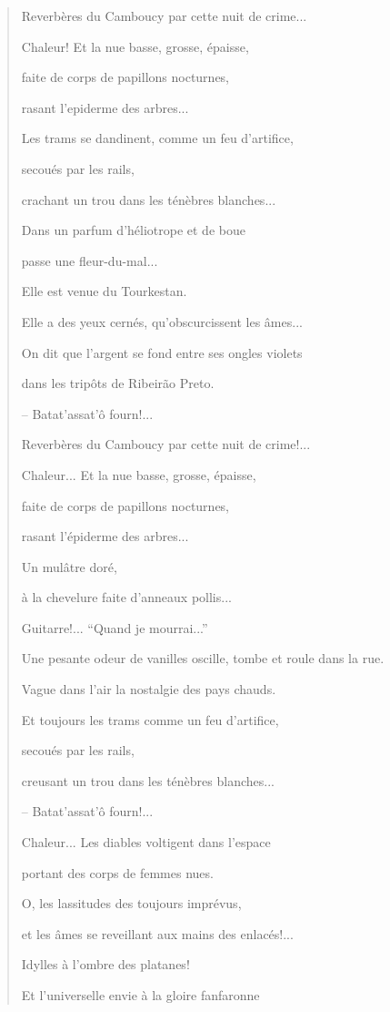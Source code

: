 \begin{verse}
Reverbères du Camboucy par cette nuit de crime...

Chaleur! Et la nue basse, grosse, épaisse,

faite de corps de papillons nocturnes,

rasant l'epiderme des arbres...

Les trams se dandinent, comme un feu d'artifice,

secoués par les rails,

crachant un trou dans les ténèbres blanches...

Dans un parfum d'héliotrope et de boue

passe une fleur-du-mal...

Elle est venue du Tourkestan.

Elle a des yeux cernés, qu'obscurcissent les âmes...

On dit que l'argent se fond entre ses ongles violets

dans les tripôts de Ribeirão Preto.

-- Batat'assat'ô fourn!...

Reverbères du Camboucy par cette nuit de crime!...

Chaleur... Et la nue basse, grosse, épaisse,

faite de corps de papillons nocturnes,

rasant l'épiderme des arbres...

Un mulâtre doré,

à la chevelure faite d'anneaux pollis...

Guitarre!... ``Quand je mourrai...''

Une pesante odeur de vanilles oscille, tombe et roule dans la rue.

Vague dans l'air la nostalgie des pays chauds.

Et toujours les trams comme un feu d'artifice,

secoués par les rails,

creusant un trou dans les ténèbres blanches...

-- Batat'assat'ô fourn!...

Chaleur... Les diables voltigent dans l'espace

portant des corps de femmes nues.

O, les lassitudes des toujours imprévus,

et les âmes se reveillant aux mains des enlacés!...

Idylles à l'ombre des platanes!

Et l'universelle envie à la gloire fanfaronne


\end{verse}
